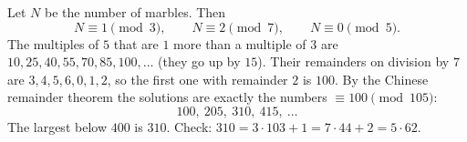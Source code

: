 Let $N$ be the number of marbles. Then
\[N\equiv1\pmod3,\qquad N\equiv2\pmod7,\qquad N\equiv0\pmod5 .\]
The multiples of $5$ that are $1$ more than a multiple of $3$ are $10,25,40,55,70,85,100,\dots$ (they go up by $15$). Their remainders on division by $7$ are $3,4,5,6,0,1,2$, so the first one with remainder $2$ is $100$. By the Chinese remainder theorem the solutions are exactly the numbers $\equiv100\pmod{105}$:
\[100,\ 205,\ 310,\ 415,\ \dots\]
The largest below $400$ is $\boxed{310}$. Check: $310=3\cdot103+1=7\cdot44+2=5\cdot62$.

